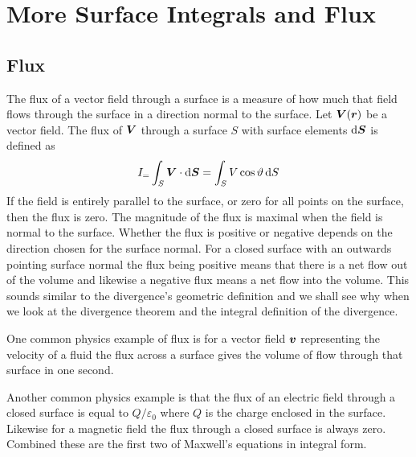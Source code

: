 \documentclass{article}
\begin{document}
    \section{More Surface Integrals and Flux}
    \subsection{Flux}
    The flux of a vector field through a surface is a measure of how much that field flows through the surface in a direction normal to the surface.
    Let \(\bm{V}(\bm{r})\) be a vector field.
    The flux of \(\bm{V}\) through a surface \(S\) with surface elements \(\dd\bm{S}\) is defined as
    \[I_ = \int_S\bm{V}\cdot\dd\bm{S} = \int_S V\cos\vartheta\,\dd S\]
    If the field is entirely parallel to the surface, or zero for all points on the surface, then the flux is zero.
    The magnitude of the flux is maximal when the field is normal to the surface.
    Whether the flux is positive or negative depends on the direction chosen for the surface normal.
    For a closed surface with an outwards pointing surface normal the flux being positive means that there is a net flow out of the volume and likewise a negative flux means a net flow into the volume.
    This sounds similar to the divergence's geometric definition and we shall see why when we look at the divergence theorem and the integral definition of the divergence.
    
    \example
    One common physics example of flux is for a vector field \(\bm{v}\) representing the velocity of a fluid the flux across a surface gives the volume of flow through that surface in one second.
    
    Another common physics example is that the flux of an electric field through a closed surface is equal to \(Q/\varepsilon_0\) where \(Q\) is the charge enclosed in the surface.
    Likewise for a magnetic field the flux through a closed surface is always zero.
    Combined these are the first two of Maxwell's equations in integral form.
    
\end{document}
